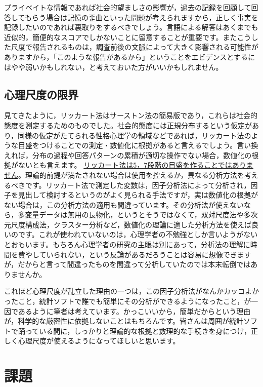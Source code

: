 \documentclass{ltjsbook}
\begin{document}
プライベイトな情報であれば社会的望ましさの影響が，過去の記録を回顧して回答してもらう場合は記憶の歪曲といった問題が考えられますから，正しく事実を記録したいのであれば裏取りをするべきでしょう。言語による解答はあくまでも近似的，簡便的なスコアでしかないことに留意することが重要です。またこうした尺度で報告されるものは，調査前後の文脈によって大きく影響される可能性がありますから，「このような報告があるから」ということをエビデンスとするにはやや弱いかもしれない，と考えておいた方がいいかもしれません。

\subsection{心理尺度の限界}

見てきたように，リッカート法はサーストン法の簡易版であり，これらは社会的態度を測定するためのものでした。社会的態度には正規分布するという仮定があり，同様の仮定がたてられる性格心理学の領域などであれば，リッカート法のような目盛をつけることでの測定・数値化に根拠があると言えるでしょう。言い換えれば，分布の過程や回答パターンの累積が適切な操作でない場合，数値化の根拠がないとも言えます。
\underline{リッカート法は5，7段階の目盛を作ることではありません}。理論的前提が満たされない場合は使用を控えるか，異なる分析方法を考えるべきです。リッカート法で測定した変数は，因子分析法によって分析され，因子を見出して検討するというのがよく見られる手法ですが，実は数値化の根拠がない場合は，この分析方法の適用も間違っています。その分析法が使えないなら，多変量データは無用の長物化，というとそうではなくて，双対尺度法\parencite{Nishisato2010}や多次元尺度構成法\parencite{Takane198002}，クラスター分析\parencite{clusterAnalysis}など，数値化の理論に適した分析方法を使えば良いのです。これが使われていないのは，心理学者の不勉強としか言いようがないとおもいます。もちろん心理学者の研究の主眼は別にあって，分析法の理解に時間を費やしていられない，という反論があるだろうことは容易に想像できますが，だからと言って間違ったものを間違って分析していたのでは本末転倒ではありませんか。

これほど心理尺度が乱立した理由の一つは，この因子分析法がなんかカッコよかったこと，統計ソフトで誰でも簡単にその分析ができるようになったこと，が一因であるように筆者は考えています。かっこいいから，簡単だからという理由が，科学的な厳密性に依拠しないことはもちろんです。皆さんは周囲が統計ソフトで踊っている間に，しっかりと理論的な根拠と数理的な手続きを身につけ，正しく心理尺度が使えるようになってほしいと思います。


\section{課題}
\end{document}
